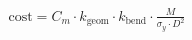 \documentclass[preview]{standalone}
\begin{document}
\begin{align*}
\text{cost} = C_m \cdot k_{\text{geom}} \cdot k_{\text{bend}} \cdot \frac{M}{\sigma_y \cdot D^2}
\end{align*}
\end{document}
